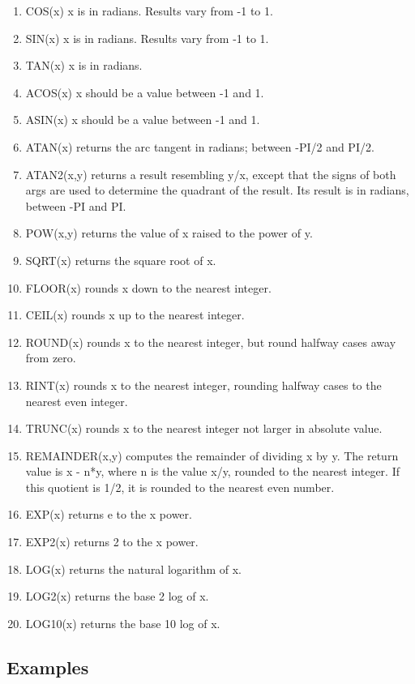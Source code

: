 \begin{enumerate}
\item COS(x) x is in radians. Results vary from -1 to 1. 
\item SIN(x) x is in radians. Results vary from -1 to 1.
\item TAN(x) x is in radians.
\item ACOS(x) x should be a value between -1 and 1.
\item ASIN(x) x should be a value between -1 and 1.
\item ATAN(x) returns the arc tangent in radians; between -PI/2 and PI/2.
\item ATAN2(x,y) returns a result resembling y/x, except that the signs of both args are used to determine the quadrant of the result. Its result is in radians, between -PI and PI.
\item POW(x,y) returns the value of x raised to the power of y.
\item SQRT(x) returns the square root of x.
\item FLOOR(x) rounds x down to the nearest integer.
\item CEIL(x) rounds x up to the nearest integer.
\item ROUND(x) rounds x to the nearest integer, but round halfway cases away from zero.
\item RINT(x) rounds x to the nearest integer, rounding halfway cases to the nearest even integer.
\item TRUNC(x) rounds x to the nearest integer not larger in absolute value.
\item REMAINDER(x,y) computes the remainder of dividing x by y. The return value is x - n*y, where n is the value x/y, rounded to the nearest integer.
If this quotient is 1/2, it is rounded to the nearest even number.
\item EXP(x) returns e to the x power.
\item EXP2(x) returns 2 to the x power.
\item LOG(x) returns the natural logarithm of x.
\item LOG2(x) returns the base 2 log of x.
\item LOG10(x) returns the base 10 log of x.
\end{enumerate}

\subsection{Examples}


